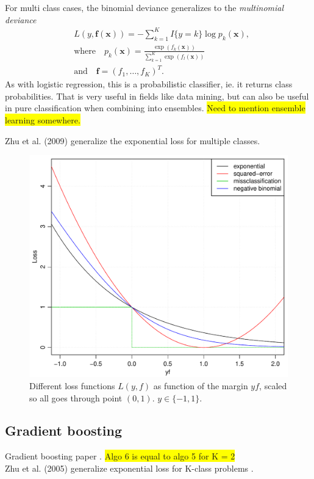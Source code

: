 For multi class cases, the binomial deviance generalizes to the \textit{multinomial deviance}
\begin{align}
  \label{eq:multinomialDeviance} 
  &L(y, \mathbf{f}( \mathbf{x })) = - \sum^{K}_{k=1} I\{y = k\} \log p_k(\mathbf{x}), \\
  \label{eq:multinomialDevianceProb} 
  &\text{where} \quad p_k(\mathbf{x}) = \frac{\exp (f_k(\mathbf{x}))}{\sum^{K}_{k=1} \exp (f_l(\mathbf{x}))}\\
  &\text{and} \quad \mathbf{f} = (f_1, \ldots, f_K)^T.
\end{align}
As with logistic regression, this is a probabilistic classifier, ie. it returns class probabilities. That is very useful in fields like data mining, but can also be useful in pure classification when combining into ensembles. \colorbox{yellow}{Need to mention ensemble learning somewhere.}

Zhu et al. (2009) \cite{zhu2009} generalize the exponential loss for multiple classes.
%
\begin{figure}[h!]
\begin{center}
    \includegraphics[scale=0.5]{./figures/lossFunctions.pdf}
\end{center}
\caption{Different loss functions $L(y, f)$ as function of the margin $yf$, scaled so all goes through point $(0, 1)$. $y \in \{-1, 1\}$.}
\label{fig:lossFunctions}
\end{figure}
%
\subsection{Gradient boosting}
\label{sub:Gradient boosting}
Gradient boosting paper \cite{friedman}. \colorbox{yellow}{Algo 6 is equal to algo 5  for K = 2}\\
Zhu et al. (2005) generalize exponential loss for K-class problems \cite[p.~349]{modstat}.

